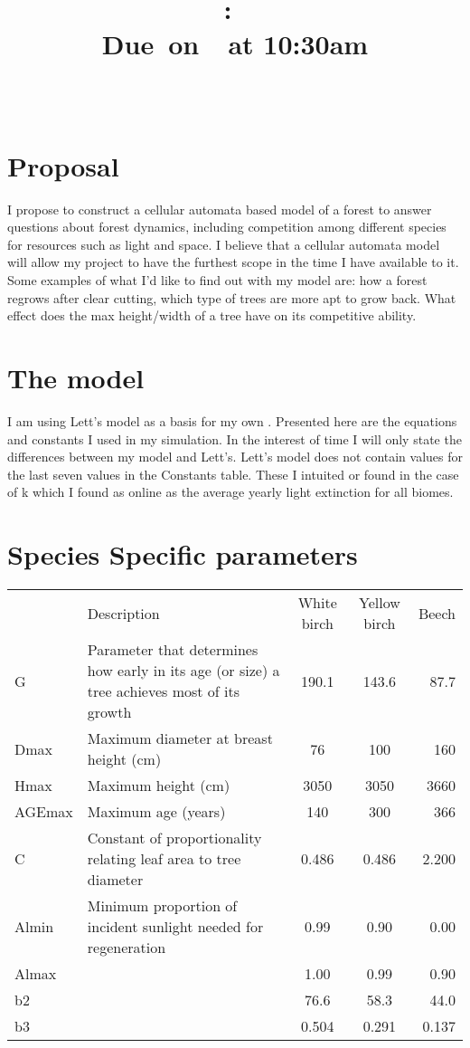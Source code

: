 \documentclass{article}
\title{
    \vspace{2in}
    \textmd{\textbf{\hmwkClass:\ \hmwkTitle}}\\
    \normalsize\vspace{0.1in}\small{Due\ on\ \hmwkDueDate\ at 10:30am}\\
    \vspace{0.1in}\large{\textit{\hmwkClassInstructor\ \hmwkClassTime}}
    \vspace{3in}
}
\author{\textbf{\hmwkAuthorName}}
\date{}
\begin{document}
\maketitle

\pagebreak
\vspace{.25cm}
\section*{Proposal}
I propose to construct a cellular automata based model of a forest to answer
questions about forest dynamics, including competition among different species for
resources such as light and space. I believe that a cellular automata model will allow
 my project to have the furthest scope in the time I have available to it. Some examples
 of what I'd like to find out with my model are: how a forest regrows after clear cutting,
 which type of trees are more apt to grow back. What effect does the max height/width of a tree
have on its competitive ability.

\section*{The model}
I am using Lett's  model as a basis for my own \cite{Lett1999277}. Presented here are the
equations and constants I used in my simulation. In the interest of time
I will only state the differences between my model and Lett's. Lett's model does
not contain values for the last seven values in the Constants table. These I intuited
or found in the case of k which I found as online as the average yearly light extinction for all biomes.


\section*{Species Specific parameters}
\begin{center}
  \begin{tabular}{|l|p{5cm}|c|c|r|}
    \hline
     & Description &White birch &	Yellow birch &	Beech\\
    G &	Parameter that determines how early in its age (or size) a tree achieves most of its growth &	190.1 &	143.6 &	87.7\\
    Dmax &	Maximum diameter at breast height (cm) &	76 &	100 &	160\\
    Hmax &	Maximum height (cm) &	3050 &	3050 &	3660\\
    AGEmax & Maximum age (years) &	140	 & 300 &	366\\
    C &	Constant of proportionality relating leaf area to tree diameter &	0.486	 & 0.486  &	2.200\\
    Almin &	 Minimum proportion of incident sunlight needed for regeneration &	0.99  &	0.90 &	0.00\\
    Almax &	 &	1.00 &	0.99 &	0.90\\
    b2 &	 &	76.6 &	58.3 &	44.0\\
    b3 &	 &	0.504 &	0.291 &	0.137\\
    \hline
  \end{tabular}
\end{center}
\end{document}
